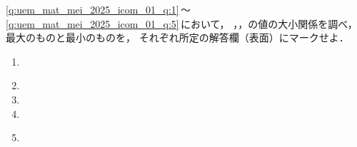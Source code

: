 \documentclass[../../../uem_mat_mei_q.tex]{subfiles}
\begin{document}
    \ref{q:uem_mat_mei_2025_icom_01_q:1}\,～\,\ref{q:uem_mat_mei_2025_icom_01_q:5}\,において，%
    ，，の値の大小関係を調べ，最大のものと最小のものを，%
    それぞれ所定の解答欄（表面）にマークせよ．
    \begin{enumerate}
        \item 
            \label{q:uem_mat_mei_2025_icom_01_q:1}
        \item 
        \item 
        \item 
        \item 
            \label{q:uem_mat_mei_2025_icom_01_q:5}
    \end{enumerate}        
\end{document}
